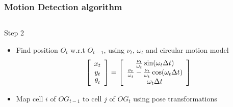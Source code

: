 \documentclass{beamer}
\begin{document}
	\begin{frame}
		\frametitle{Motion Detection algorithm}

		  \begin{columns}[t]
		  \begin{column}{5cm}
			\begin{block}{Step 2}		  %
			\begin{itemize}
			\item Find position $O_t$ w.r.t $O_{t-1}$, using $\nu_t$, $\omega_t$ and circular motion model
			\begin{equation}
			\left[\begin{array}{c}x_t \\ y_t\\ \theta_t \end{array} \right] = 
			\left[\begin{array}{c} {\nu_t \over \omega_t} \sin(\omega_t \Delta t) \\ {\nu_t \over \omega_t} - {\nu_t \over \omega_t} \cos(\omega_t \Delta t) \\ \omega_t \Delta t \end{array}\right]
			\label{eq:circularmotion}
			\end{equation}
			\item Map cell $i$ of $OG_{t-1}$ to cell $j$ of $OG_{t}$ using pose transformations
			\end{itemize}		
			\end{block}			
			

\end{column}
\end{columns}
\end{frame}
\end{document}
